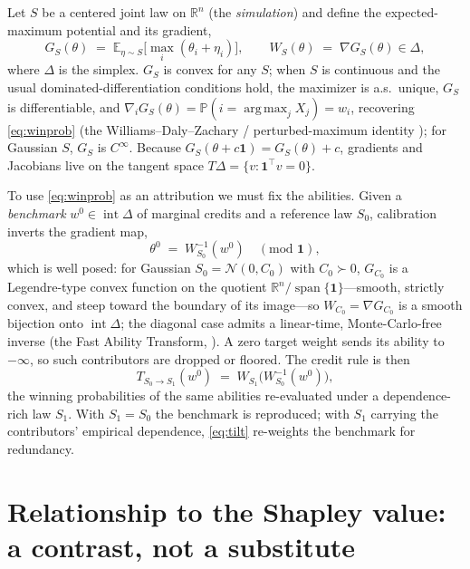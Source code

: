\documentclass[11pt]{article}
\newcommand{\E}{\mathbb{E}}
\newcommand{\Prob}{\mathbb{P}}
\newcommand{\R}{\mathbb{R}}
\DeclareMathOperator*{\argmaxop}{arg\,max}
\begin{document}
Let $S$ be a centered joint law on $\R^n$ (the \emph{simulation}) and define the
expected-maximum potential and its gradient,
\begin{equation}
  G_S(\theta) \;=\; \E_{\eta\sim S}\Big[\max_i (\theta_i + \eta_i)\Big],
  \qquad
  W_S(\theta) \;=\; \nabla G_S(\theta) \in \Delta,
  \label{eq:potential}
\end{equation}
where $\Delta$ is the simplex. $G_S$ is convex for any $S$; when $S$ is continuous and
the usual dominated-differentiation conditions hold, the maximizer is a.s.\ unique,
$G_S$ is differentiable, and $\nabla_i G_S(\theta) = \Prob(i = \argmaxop_j X_j) = w_i$,
recovering \eqref{eq:winprob} (the Williams--Daly--Zachary / perturbed-maximum
identity \parencite{williams1977, mcfadden1981, berthet2020}); for Gaussian $S$,
$G_S$ is $C^\infty$. Because $G_S(\theta + c\mathbf 1) = G_S(\theta) + c$, gradients
and Jacobians live on the tangent space $T\Delta = \{v : \mathbf 1^\top v = 0\}$.

To use \eqref{eq:winprob} as an attribution we must fix the abilities. Given a
\emph{benchmark} $w^0 \in \operatorname{int}\Delta$ of marginal credits and a
reference law $S_0$, calibration inverts the gradient map,
\begin{equation}
  \theta^0 \;=\; W_{S_0}^{-1}(w^0) \quad (\text{mod } \mathbf 1),
  \label{eq:calib}
\end{equation}
which is well posed: for Gaussian $S_0 = \mathcal N(0, C_0)$ with $C_0 \succ 0$,
$G_{C_0}$ is a Legendre-type convex function on the quotient
$\R^n/\!\operatorname{span}\{\mathbf 1\}$---smooth, strictly convex, and steep toward
the boundary of its image---so $W_{C_0} = \nabla G_{C_0}$ is a smooth bijection onto
$\operatorname{int}\Delta$; the diagonal case admits a linear-time, Monte-Carlo-free
inverse (the Fast Ability Transform, \textcite{cotton2021}). A zero target weight
sends its ability to $-\infty$, so such contributors are dropped or floored. The
credit rule is then
\begin{equation}
  T_{S_0\to S_1}(w^0) \;=\; W_{S_1}\!\big(W_{S_0}^{-1}(w^0)\big),
  \label{eq:tilt}
\end{equation}
the winning probabilities of the same abilities re-evaluated under a
dependence-rich law $S_1$. With $S_1 = S_0$ the benchmark is reproduced; with $S_1$
carrying the contributors' empirical dependence, \eqref{eq:tilt} re-weights the
benchmark for redundancy.

\section{Relationship to the Shapley value: a contrast, not a substitute}
\label{sec:shapley}
\end{document}

